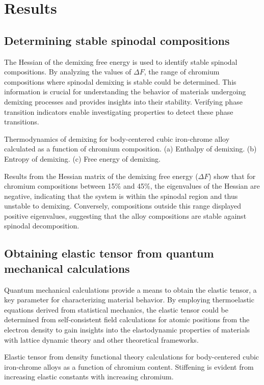 \section{Results}
\subsection{Determining stable spinodal compositions}
The Hessian of the demixing free energy is used to identify stable spinodal compositions. By analyzing the values of $\Delta F$, the range of chromium compositions where spinodal demixing is stable could be determined. This information is crucial for understanding the behavior of materials undergoing demixing processes and provides insights into their stability. Verifying phase transition indicators enable investigating properties to detect these phase transitions. 

Thermodynamics of demixing for body-centered cubic iron-chrome alloy calculated as a function of chromium composition. \cite{korzhavyi2009electronic,trochet2021influence,levesque2011simple, binder2001spinodal}(a) Enthalpy of demixing. (b) Entropy of demixing. (c) Free energy of demixing. 

Results from the Hessian matrix of the demixing free energy ($\Delta F$) show that for chromium compositions between 15\% and 45\%, the eigenvalues of the Hessian are negative, indicating that the system is within the spinodal region and thus unstable to demixing. Conversely, compositions outside this range displayed positive eigenvalues, suggesting that the alloy compositions are stable against spinodal decomposition.

\subsection{Obtaining elastic tensor from quantum mechanical calculations}
Quantum mechanical calculations provide a means to obtain the elastic tensor, a key parameter for characterizing material behavior. By employing thermoelastic equations derived from statistical mechanics, the elastic tensor could be determined from self-consistent field calculations for atomic positions from the electron density to gain insights into the elastodynamic properties of materials with lattice dynamic theory and other theoretical frameworks.

Elastic tensor from density functional theory calculations for body-centered cubic iron-chrome alloys as a function of chromium content. Stiffening is evident from increasing elastic constants with increasing chromium. \cite{korzhavyi2009electronic,razumovskiy2011first}

